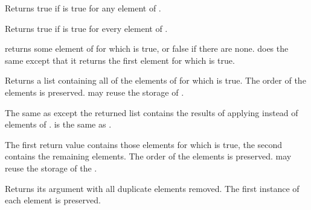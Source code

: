 \begin{protos}
\end{protos}
Returns true if  is true for any element of .

\begin{protos}
\end{protos}
  Returns true if  is true for every element of .

\begin{protos}
\end{protos}
 returns some element of  for which  is true, or
false if there are none.   does the same except that it returns
the first element for which  is true.

\begin{protos}
\end{protos}
Returns a list containing all of the elements of  for which
 is true.  The order of the elements is preserved.
 may reuse the storage of .

\begin{protos}
\end{protos}
The same as  except the returned list contains the results of
applying  instead of elements of .   is the same as .

\begin{protos}
\end{protos}
The first return value contains those elements  for which
 is true, the second contains the remaining elements.
The order of the elements is preserved.   may
reuse the storage of the .

\begin{protos}
\end{protos}
Returns its argument with all duplicate elements removed.  The first
instance of each element is preserved.

